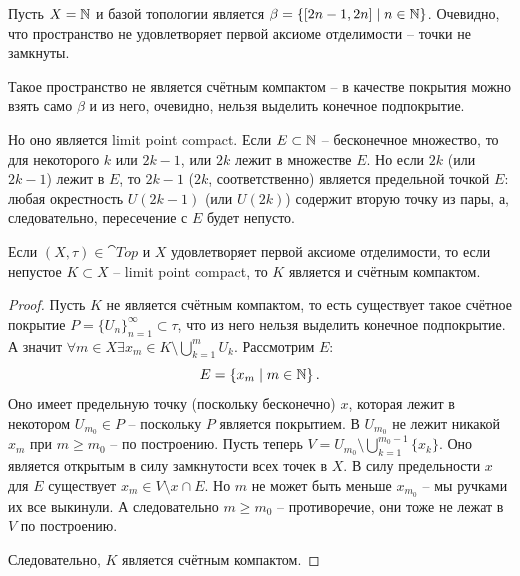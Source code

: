 \begin{example}
    Пусть $X = \mathbb{N}$ и базой топологии является $\beta = \left\{[2n - 1, 2n] \mid n \in \mathbb{N}\right\}$.
    Очевидно, что пространство не удовлетворяет первой аксиоме отделимости -- точки не замкнуты.

    Такое пространство не является счётным компактом -- в качестве покрытия можно взять само $\beta$ и из него, очевидно, нельзя выделить конечное подпокрытие.

    Но оно является limit point compact.
    Если $E \subset \mathbb{N}$ -- бесконечное множество, то для некоторого $k$ или $2k - 1$, или $2k$ лежит в множестве $E$.
    Но если $2k$ (или $2k - 1$) лежит в $E$, то $2k - 1$ ($2k$, соответственно) является предельной точкой $E$: любая окрестность $U(2k - 1)$ (или $U(2k)$) содержит вторую точку из пары, а, следовательно, пересечение с $E$ будет непусто.
\end{example}
\begin{proposition}
    Если $(X, \tau) \in \cat{Top}$ и $X$ удовлетворяет первой аксиоме отделимости, то если непустое $K \subset X$ -- limit point compact, то $K$ является и счётным компактом.
\end{proposition}
\begin{proof}
    Пусть $K$ не является счётным компактом, то есть существует такое счётное покрытие $P = \{U_n\}_{n = 1}^{\infty} \subset \tau$, что из него нельзя выделить конечное подпокрытие.
    А значит $\forall m \in X \exists x_m \in K \setminus \bigcup_{k = 1}^{m} U_k$.
    Рассмотрим $E\colon$
    \[
        E = \left\{x_m \mid m \in \mathbb{N}\right\}.
    \]
    Оно имеет предельную точку (поскольку бесконечно) $x$, которая лежит в некотором $U_{m_0} \in P$ -- поскольку $P$ является покрытием.
    В $U_{m_0}$ не лежит никакой $x_m$ при $m \geq m_0$ -- по построению.
    Пусть теперь $V = U_{m_0} \setminus \bigcup_{k = 1}^{m_0 - 1} \{x_k\}$.
    Оно является открытым в силу замкнутости всех точек в $X$.
    В силу предельности $x$ для $E$ существует $x_m \in V \setminus x \cap E$.
    Но $m$ не может быть меньше $x_{m_0}$ -- мы ручками их все выкинули.
    А следовательно $m \geq m_0$ -- противоречие, они тоже не лежат в $V$ по построению.

    Следовательно, $K$ является счётным компактом.
\end{proof}
